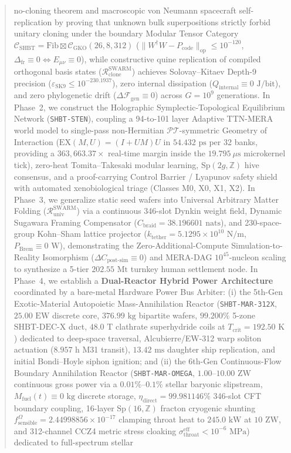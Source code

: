 \documentclass[11pt,onecolumn]{article}
\begin{document}
\begin{abstract}
no-cloning theorem and macroscopic von Neumann spacecraft self-replication by proving that unknown bulk superpositions strictly forbid unitary cloning under the boundary Modular Tensor Category $\mathcal{C}_{\text{SHBT}} = \text{Fib} \boxtimes \mathcal{C}_{\text{GKO}}(26, 8, 312)$ ($\|W^\dagger W - P_{\text{code}}\|_{\text{op}} \le 10^{-120}$, $\Delta_{\text{fr}} \equiv 0 \iff E_{\mu\nu} \equiv 0$), while constructive quine replication of compiled orthogonal basis states ($\mathcal{R}_{\text{clone}}^{\text{SWARM}}$) achieves Solovay--Kitaev Depth-9 precision ($\varepsilon_{\text{SK9}} \le 10^{-230.1937}$), zero internal dissipation ($Q_{\text{internal}} \equiv 0\text{ J/bit}$), and zero phylogenetic drift ($\Delta\mathcal{F}_{\text{gen}} \equiv 0$) across $G = 10^9$ generations. In Phase~2, we construct the Holographic Symplectic-Topological Equilibrium Network (\texttt{SHBT-STEN}), coupling a 94-to-101 layer Adaptive TTN-MERA world model to single-pass non-Hermitian $\mathcal{PT}$-symmetric Geometry of Interaction ($\text{EX}(M,U) = (I+UM)U$ in $54.432\text{ ps}$ per 32 banks, providing a $363{,}663.37\times$ real-time margin inside the $19.795\ \mu\text{s}$ microkernel tick), zero-heat Tomita--Takesaki modular learning, $\text{Sp}(2g,\mathbb{Z})$ hive consensus, and a proof-carrying Control Barrier / Lyapunov safety shield with automated xenobiological triage (Classes M0, X0, X1, X2). In Phase~3, we generalize static seed wafers into Universal Arbitrary Matter Folding ($\mathcal{R}_{\text{univ}}^{\text{SWARM}}$) via a continuous 346-slot Dynkin weight field, Dynamic Sugawara Framing Compensator ($C_{\text{braid}} = 38.196601\text{ nats}$), and 230-space-group Kohn--Sham lattice projector ($k_{\text{tether}} = 5.1295 \times 10^{10}\text{ N/m}$, $P_{\text{Brem}} \equiv 0\text{ W}$), demonstrating the Zero-Additional-Compute Simulation-to-Reality Isomorphism ($\Delta C_{\text{post-sim}} \equiv 0$) and MERA-DAG $10^{45}$-nucleon scaling to synthesize a 5-tier $202.55\text{ Mt}$ turnkey human settlement node. In Phase~4, we establish a \textbf{Dual-Reactor Hybrid Power Architecture} coordinated by a bare-metal Hardware Power Bus Arbiter: (i) the 5th-Gen Exotic-Material Autopoietic Mass-Annihilation Reactor (\texttt{SHBT-MAR-312X}, $25.00\text{ EW}$ discrete core, $376.99\text{ kg}$ bipartite wafers, $99.200\%$ 5-zone $\text{SHBT-DEC-X}$ duct, $48.0\text{ T}$ clathrate superhydride coils at $T_{\text{crit}} = 192.50\text{ K}$) dedicated to deep-space traversal, Alcubierre/EW-312 warp soliton actuation ($8.957\text{ h}$ M31 transit), $13.42\text{ ms}$ daughter ship replication, and initial Bondi--Hoyle siphon ignition; and (ii) the 6th-Gen Continuous-Flow Boundary Annihilation Reactor (\texttt{SHBT-MAR-OMEGA}, $1.00\text{--}10.00\text{ ZW}$ continuous gross power via a $0.01\%\text{--}0.1\%$ stellar baryonic slipstream, $M_{\text{fuel}}(t) \equiv 0\text{ kg}$ discrete storage, $\eta_{\text{direct}} = 99.981146\%$ 346-slot CFT boundary coupling, 16-layer $\text{Sp}(16,\mathbb{Z})$ fracton cryogenic shunting $f_{\text{sensible}}^\Omega = 2.44998856 \times 10^{-17}$ clamping throat heat to $245.0\text{ kW}$ at $10\text{ ZW}$, and 312-channel CCZ4 metric stress cloaking $\sigma_{\text{throat}}^{\text{eff}} < 10^{-6}\text{ MPa}$) dedicated to full-spectrum stellar 
\end{abstract}
\end{document}
